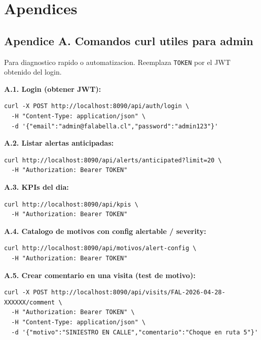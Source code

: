 \documentclass[11pt,a4paper]{article}
\begin{document}
\section{Apendices}

\subsection*{Apendice A. Comandos curl utiles para admin}

Para diagnostico rapido o automatizacion. Reemplaza
\texttt{TOKEN} por el JWT obtenido del login.

\textbf{A.1. Login (obtener JWT):}

\begin{lstlisting}
curl -X POST http://localhost:8090/api/auth/login \
  -H "Content-Type: application/json" \
  -d '{"email":"admin@falabella.cl","password":"admin123"}'
\end{lstlisting}

\textbf{A.2. Listar alertas anticipadas:}

\begin{lstlisting}
curl http://localhost:8090/api/alerts/anticipated?limit=20 \
  -H "Authorization: Bearer TOKEN"
\end{lstlisting}

\textbf{A.3. KPIs del dia:}

\begin{lstlisting}
curl http://localhost:8090/api/kpis \
  -H "Authorization: Bearer TOKEN"
\end{lstlisting}

\textbf{A.4. Catalogo de motivos con config alertable / severity:}

\begin{lstlisting}
curl http://localhost:8090/api/motivos/alert-config \
  -H "Authorization: Bearer TOKEN"
\end{lstlisting}

\textbf{A.5. Crear comentario en una visita (test de motivo):}

\begin{lstlisting}
curl -X POST http://localhost:8090/api/visits/FAL-2026-04-28-XXXXXX/comment \
  -H "Authorization: Bearer TOKEN" \
  -H "Content-Type: application/json" \
  -d '{"motivo":"SINIESTRO EN CALLE","comentario":"Choque en ruta 5"}'
\end{lstlisting}
\end{document}
